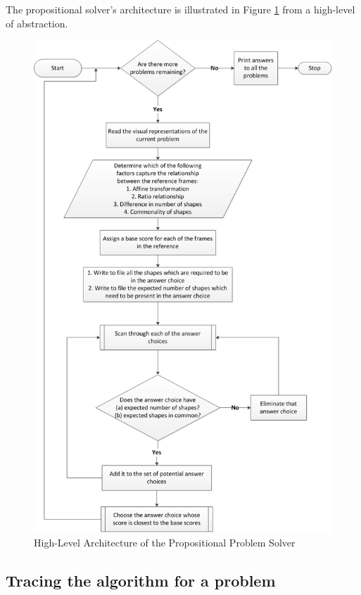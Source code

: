 \documentclass[10pt, letter]{article}
\begin{document}
The propositional solver's architecture is illustrated in Figure \ref{fig19} from a high-level of abstraction.
\begin{figure}[h!]
  \centering
    \includegraphics[scale = 0.35]{Images/fig9_flowchart}
    \caption{High-Level Architecture of the Propositional Problem Solver}
  \label{fig19}
\end{figure}

\subsection*{Tracing the algorithm for a problem}
\end{document}
